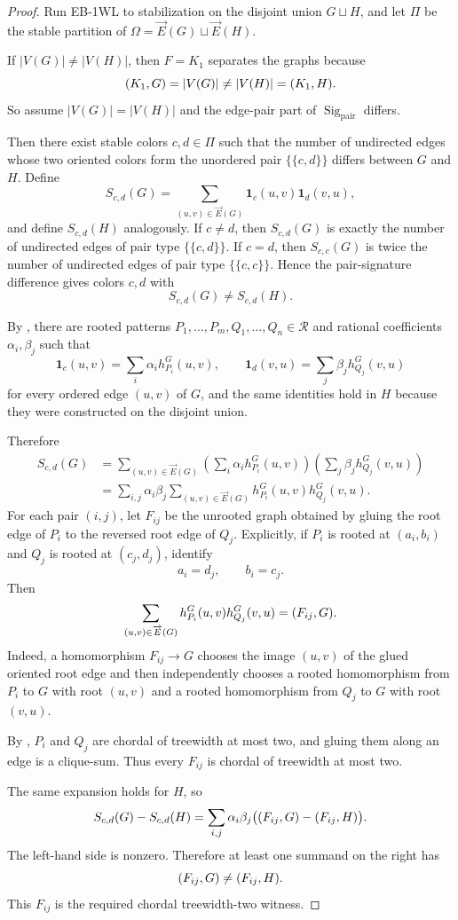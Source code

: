 \documentclass[11pt]{article}
\let\hom\relax
\DeclareMathOperator{\hom}{hom}
\DeclareMathOperator{\Sig}{Sig}
\newcommand{\cR}{\mathcal{R}}
\newcommand{\vecE}{\overrightarrow{E}}
\newcommand{\mset}[1]{\{\!\{#1\}\!\}}
\begin{document}
\begin{proof}
Run EB-1WL to stabilization on the disjoint union $G\sqcup H$, and let $\Pi$ be the stable partition of $\Omega=\vecE(G)\sqcup\vecE(H)$.

If $|V(G)|\neq |V(H)|$, then $F=K_1$ separates the graphs because
\[
\hom(K_1,G)=|V(G)|\neq |V(H)|=\hom(K_1,H).
\]
So assume $|V(G)|=|V(H)|$ and the edge-pair part of $\Sig_{\mathrm{pair}}$ differs.

Then there exist stable colors $c,d\in\Pi$ such that the number of undirected edges whose two oriented colors form the unordered pair $\mset{c,d}$ differs between $G$ and $H$.  Define
\[
S_{c,d}(G)=\sum_{(u,v)\in\vecE(G)}\mathbf{1}_c(u,v)\mathbf{1}_d(v,u),
\]
and define $S_{c,d}(H)$ analogously.  If $c\neq d$, then $S_{c,d}(G)$ is exactly the number of undirected edges of pair type $\mset{c,d}$.  If $c=d$, then $S_{c,c}(G)$ is twice the number of undirected edges of pair type $\mset{c,c}$.  Hence the pair-signature difference gives colors $c,d$ with
\[
S_{c,d}(G)\neq S_{c,d}(H).
\]

By , there are rooted patterns $P_1,\ldots,P_m,Q_1,\ldots,Q_n\in\cR$ and rational coefficients $\alpha_i,\beta_j$ such that
\[
\mathbf{1}_c(u,v)=\sum_i\alpha_i h_{P_i}^G(u,v),
\qquad
\mathbf{1}_d(v,u)=\sum_j\beta_j h_{Q_j}^G(v,u)
\]
for every ordered edge $(u,v)$ of $G$, and the same identities hold in $H$ because they were constructed on the disjoint union.

Therefore
\begin{align*}
S_{c,d}(G)
&=\sum_{(u,v)\in\vecE(G)}
\left(\sum_i\alpha_i h_{P_i}^G(u,v)\right)
\left(\sum_j\beta_j h_{Q_j}^G(v,u)\right)\\
&=\sum_{i,j}\alpha_i\beta_j
\sum_{(u,v)\in\vecE(G)}h_{P_i}^G(u,v)h_{Q_j}^G(v,u).
\end{align*}
For each pair $(i,j)$, let $F_{ij}$ be the unrooted graph obtained by gluing the root edge of $P_i$ to the reversed root edge of $Q_j$.  Explicitly, if $P_i$ is rooted at $(a_i,b_i)$ and $Q_j$ is rooted at $(c_j,d_j)$, identify
\[
a_i=d_j,
\qquad
b_i=c_j.
\]
Then
\[
\sum_{(u,v)\in\vecE(G)}h_{P_i}^G(u,v)h_{Q_j}^G(v,u)=\hom(F_{ij},G).
\]
Indeed, a homomorphism $F_{ij}\to G$ chooses the image $(u,v)$ of the glued oriented root edge and then independently chooses a rooted homomorphism from $P_i$ to $G$ with root $(u,v)$ and a rooted homomorphism from $Q_j$ to $G$ with root $(v,u)$.

By , $P_i$ and $Q_j$ are chordal of treewidth at most two, and gluing them along an edge is a clique-sum.  Thus every $F_{ij}$ is chordal of treewidth at most two.

The same expansion holds for $H$, so
\[
S_{c,d}(G)-S_{c,d}(H)
=\sum_{i,j}\alpha_i\beta_j
\bigl(\hom(F_{ij},G)-\hom(F_{ij},H)\bigr).
\]
The left-hand side is nonzero.  Therefore at least one summand on the right has
\[
\hom(F_{ij},G)\neq \hom(F_{ij},H).
\]
This $F_{ij}$ is the required chordal treewidth-two witness.
\end{proof}
\end{document}
